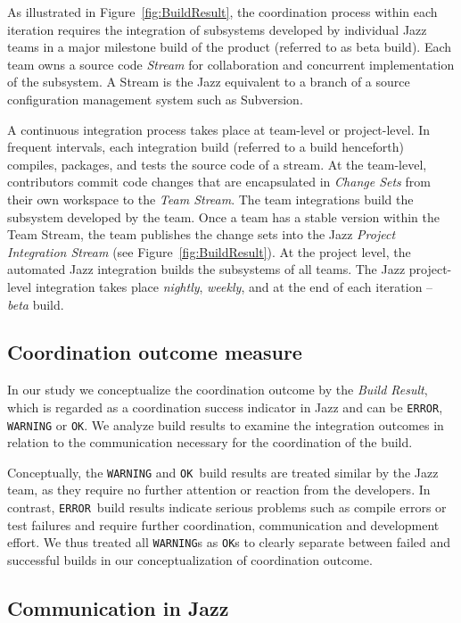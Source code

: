 \documentclass[12pt,oneside]{book}
\newcommand\error{\texttt{ERROR}}
\newcommand\ok{\texttt{OK}}
\newcommand{\et}[1]{\emph{#1}}
\begin{document}
As illustrated in Figure~\ref{fig:BuildResult}, the coordination process within
each iteration requires the integration of subsystems developed by individual
Jazz teams in a major milestone build of the product (referred to as beta build).
Each team owns a source code \et{Stream} for collaboration and concurrent
implementation of the subsystem. A Stream is the Jazz equivalent to a branch of a
source configuration management system such as Subversion.

A continuous integration process takes place at team-level or project-level. In
frequent intervals, each integration build (referred to a build henceforth)
compiles, packages, and tests the source code of a stream. At the team-level,
contributors commit code changes that are encapsulated in \et{Change Sets} from
their own workspace to the \et{Team Stream}. The team integrations build the
subsystem developed by the team. Once a team has a stable version within the Team
Stream, the team publishes the change sets into the Jazz \et{Project Integration
Stream} (see Figure~\ref{fig:BuildResult}). At the project level, the automated
Jazz integration builds the subsystems of all teams. The Jazz project-level
integration takes place \et{nightly}, \et{weekly}, and at the end of each
iteration -- \et{beta} build.

\subsection{Coordination outcome measure}
In our study we conceptualize the coordination outcome by the \et{Build Result},
which is regarded as a coordination success indicator in Jazz and can be \error,
\texttt{WARNING} or \ok. We analyze build results to examine the integration
outcomes in relation to the communication necessary for the coordination of the
build.

Conceptually, the \texttt{WARNING} and \ok\ build results are treated similar by
the Jazz team, as they require no further attention or reaction from the
developers. In contrast, \error\ build results indicate serious problems such as
compile errors or test failures and require further coordination, communication
and development effort. We thus treated all \texttt{WARNING}s as \ok s to clearly
separate between failed and successful builds in our conceptualization of
coordination outcome.


\subsection{Communication in Jazz}
\end{document}
